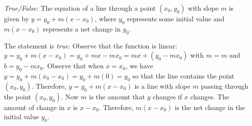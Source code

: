 \documentclass[11pt,letterpaper]{article}
\begin{document}
\quizsol \textit{True/False}: The equation of a line through a point $(x_0, y_0)$ with slope $m$ is given by $y= y_0 + m(x - x_0)$, where $y_0$ represents some initial value and $m(x - x_0)$ represents a net change in $y_0$. \pspace

\sol The statement is \textit{true}. Observe that the function is linear: $y= y_0 + m(x - x_0)= y_0 + mx - mx_0= mx + (y_0 - mx_0)$ with $m= m$ and $b= y_0 - mx_0$. Observe that when $x= x_0$, we have $y= y_0 + m(x_0 - x_0)= y_0 + m(0)= y_0$ so that the line contains the point $(x_0 , y_0)$. Therefore, $y= y_0 + m(x - x_0)$ is a line with slope $m$ passing through the point $(x_0, y_0)$. Now $m$ is the amount that $y$ changes if $x$ changes. The amount of change in $x$ is $x - x_0$. Therefore, $m(x - x_0)$ is the net change in the initial value $y_0$. 
\end{document}
